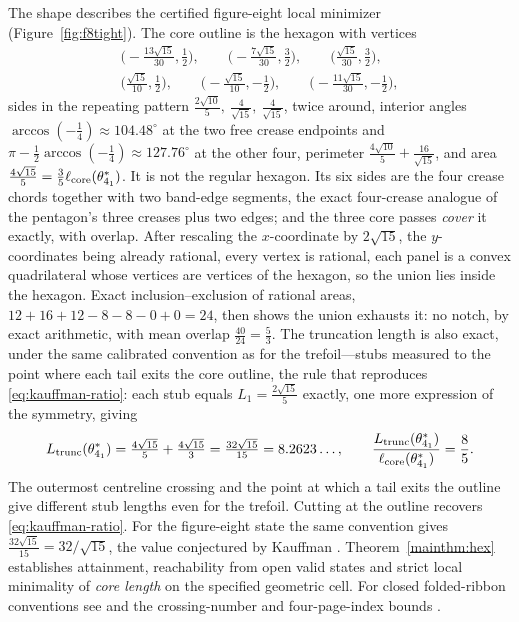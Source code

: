 The shape describes the certified figure-eight local minimizer (Figure~\ref{fig:f8tight}). The core outline is the hexagon with vertices
\begin{gather*}
\big({-}\tfrac{13\sqrt{15}}{30},\tfrac12\big),\qquad
\big({-}\tfrac{7\sqrt{15}}{30},\tfrac32\big),\qquad
\big(\tfrac{\sqrt{15}}{30},\tfrac32\big),\\
\big(\tfrac{\sqrt{15}}{10},\tfrac12\big),\qquad
\big({-}\tfrac{\sqrt{15}}{10},-\tfrac12\big),\qquad
\big({-}\tfrac{11\sqrt{15}}{30},-\tfrac12\big),
\end{gather*}
sides in the repeating pattern $\tfrac{2\sqrt{10}}5,\ \tfrac4{\sqrt{15}},\ \tfrac4{\sqrt{15}}$, twice around, interior angles $\arccos(-\tfrac14)\approx104.48^\circ$ at the two free crease endpoints and $\pi-\tfrac12\arccos(-\tfrac14)\approx127.76^\circ$ at the other four, perimeter $\tfrac{4\sqrt{10}}5+\tfrac{16}{\sqrt{15}}$, and area $\tfrac{4\sqrt{15}}5=\tfrac35\ell_{\mathrm{core}}(\theta^*_{4_1})$. It is not the regular hexagon. Its six sides are the four crease chords together with two band-edge segments, the exact four-crease analogue of the pentagon's three creases plus two edges; and the three core passes \emph{cover} it exactly, with overlap. After rescaling the $x$-coordinate by $2\sqrt{15}$, the $y$-coordinates being already rational, every vertex is rational, each panel is a convex quadrilateral whose vertices are vertices of the hexagon, so the union lies inside the hexagon. Exact inclusion--exclusion of rational areas, $12+16+12-8-8-0+0=24$, then shows the union exhausts it: no notch, by exact arithmetic, with mean overlap $\tfrac{40}{24}=\tfrac53$. The truncation length is also exact, under the same calibrated convention as for the trefoil---stubs measured to the point where each tail exits the core outline, the rule that reproduces \eqref{eq:kauffman-ratio}: each stub equals $L_1=\tfrac{2\sqrt{15}}5$ exactly, one more expression of the symmetry, giving
\[
L_{\mathrm{trunc}}(\theta^*_{4_1})=\tfrac{4\sqrt{15}}5+\tfrac{4\sqrt{15}}3=\tfrac{32\sqrt{15}}{15}=8.2623\ldots,
\qquad \frac{L_{\mathrm{trunc}}(\theta^*_{4_1})}{\ell_{\mathrm{core}}(\theta^*_{4_1})}=\frac85 .
\]
The outermost centreline crossing and the point at which a tail exits the outline give different stub lengths even for the trefoil. Cutting at the outline recovers \eqref{eq:kauffman-ratio}. For the figure-eight state the same convention gives $\tfrac{32\sqrt{15}}{15}=32/\sqrt{15}$, the value conjectured by Kauffman \cite{kauffman2004}. Theorem~\ref{mainthm:hex} establishes attainment, reachability from open valid states and strict local minimality of \emph{core length} on the specified geometric cell. For closed folded-ribbon conventions see \cite{denne2020,chen2025,yoo2026} and the crossing-number and four-page-index bounds \cite{kimnoyoo2026,yoo2026b}.


